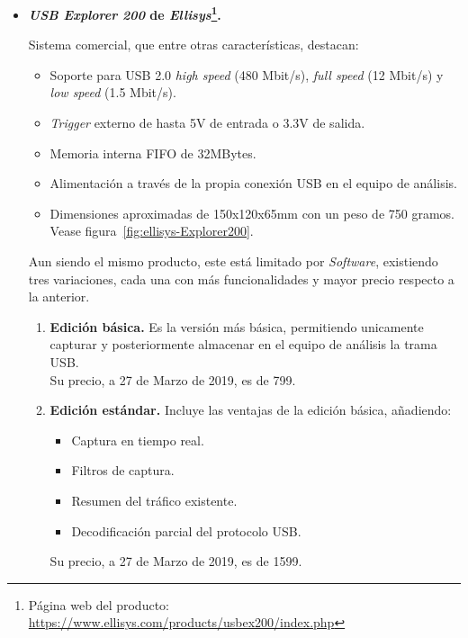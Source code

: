 \begin{itemize}
    \item \textbf{\emph{USB Explorer 200} de \emph{Ellisys}\footnote{Página web del producto: \url{https://www.ellisys.com/products/usbex200/index.php}}.}
    
    Sistema comercial, que entre otras características\cite{ellisys2008}, destacan:
    \begin{itemize}
        \item Soporte para USB 2.0 \emph{high speed} (480 Mbit/s), \emph{full speed} (12 Mbit/s) y \emph{low speed} (1.5 Mbit/s).
        \item \emph{Trigger} externo de hasta 5V de entrada o 3.3V de salida.
        \item Memoria interna FIFO de 32MBytes.
        \item Alimentación a través de la propia conexión USB en el equipo de análisis.
        \item Dimensiones aproximadas de 150x120x65mm con un peso de 750 gramos. Vease figura~\ref{fig:ellisys-Explorer200}.
    \end{itemize}

    Aun siendo el mismo producto, este está limitado por \emph{Software}, existiendo tres variaciones, cada una con más funcionalidades y mayor precio respecto a la anterior.

    \begin{enumerate}
        \item \textbf{Edición básica.}
        Es la versión más básica, permitiendo unicamente capturar y posteriormente almacenar en el equipo de análisis la trama USB. \\
        Su precio, a 27 de Marzo de 2019, es de 799\texteuro.
      
        \item \textbf{Edición estándar.}
        Incluye las ventajas de la edición básica, añadiendo:
        \begin{itemize}
            \item Captura en tiempo real.
            \item Filtros de captura.
            \item Resumen del tráfico existente.
            \item Decodificación parcial del protocolo USB.
        \end{itemize}
        Su precio, a 27 de Marzo de 2019, es de 1599\texteuro.
        

\end{enumerate}
\end{itemize}
